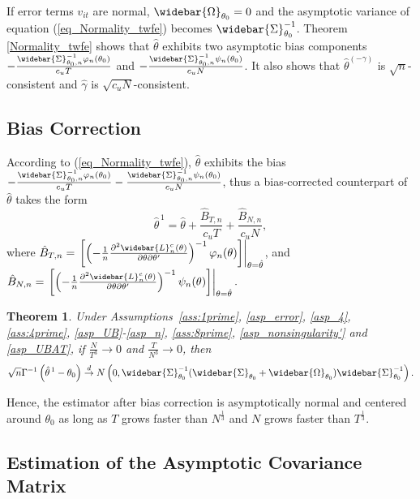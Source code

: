 \documentclass[11pt,a4paper]{article}
\newtheorem{theorem}{Theorem}
\begin{document}
If error terms $v_{it}$ are normal, $\widebar{\Omega}_{\theta_0}=0$ and the asymptotic variance of equation (\ref{eq_Normality_twfe}) becomes $\widebar{\Sigma}_{\theta_0}^{-1}$.
Theorem \ref{Normality_twfe} shows that $\hat{\theta}$ exhibits two asymptotic bias components $-\frac{\widebar{\Sigma}_{\theta_0,n}^{-1}\varphi_n(\theta_0)}{c_uT}$ and $-\frac{\widebar{\Sigma}_{\theta_0,n}^{-1}\psi_n(\theta_0)}{c_uN}$.
It also shows that $\hat{\theta}^{(-\gamma)}$ is $\sqrt{n}$-consistent and $\hat{\gamma}$ is $\sqrt{c_uN}$-consistent.

\subsection{Bias Correction}

According to (\ref{eq_Normality_twfe}), $\hat{\theta}$ exhibits the bias
$-\frac{\widebar{\Sigma}_{\theta_0,n}^{-1}\varphi_n(\theta_0)}{c_uT}-\frac{\widebar{\Sigma}_{\theta_0,n}^{-1}\psi_n(\theta_0)}{c_uN}$,
thus a bias-corrected counterpart of $\hat{\theta}$ takes the form
\[
\hat{\theta}^{\,1}
=
\hat{\theta}
+
\frac{\hat{B}_{T,n}}{c_uT}
+
\frac{\hat{B}_{N,n}}{c_uN},
\]
where
\(
\hat{B}_{T,n}
=
\left.
\left[
\left(
-\frac{1}{n}\frac{\partial^2\widebar{L}_n^{c}(\theta)}{\partial\theta\partial\theta'}
\right)^{-1}
\varphi_n(\theta)
\right]
\right|_{\theta=\hat{\theta}}\),
and
\(\hat{B}_{N,n}
=
\left.
\left[
\left(
-\frac{1}{n}\frac{\partial^2\widebar{L}_n^{c}(\theta)}{\partial\theta\partial\theta'}
\right)^{-1}
\psi_n(\theta)
\right]
\right|_{\theta=\hat{\theta}}.
\)

\begin{theorem}\label{bias-corrected_Normality_twfe}
Under Assumptions~\ref{ass:1prime}, \ref{asp_error}, \ref{asp_4}, \ref{ass:4prime}, \ref{asp_UB}-\ref{asp_n}, \ref{ass:8prime}, \ref{asp_nonsingularity'} and \ref{asp_UBAT}, if
$\frac{N}{T^3}\rightarrow0$ and
$\frac{T}{N^3}\rightarrow0$,
then
\begin{align*}
\sqrt{n}\Gamma^{-1}\left(\hat{\theta}^{\,1}-\theta_0\right)
\overset{d}{\rightarrow}
N\left(
0,
\widebar{\Sigma}_{\theta_0}^{-1}
(\widebar{\Sigma}_{\theta_0}+\widebar{\Omega}_{\theta_0})
\widebar{\Sigma}_{\theta_0}^{-1}
\right).
\end{align*}
\end{theorem}
Hence, the estimator after bias correction is asymptotically normal and centered around $\theta_0$ as long as $T$ grows faster than $N^{\frac{1}{3}}$ and $N$ grows faster than $T^{\frac{1}{3}}$.

\subsection{Estimation of the Asymptotic Covariance Matrix}
\end{document}
